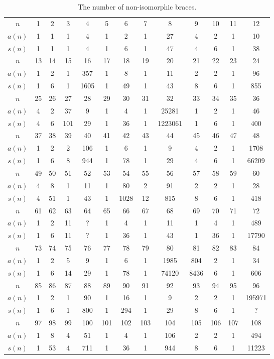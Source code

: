 \begin{table}[ht]
	\caption{The number of non-isomorphic braces.}
	\begin{tabular}{|c|cccccccccccc|}
		\hline
		$n$ & 1 & 2 & 3 & 4 & 5  & 6 & 7 & 8 & 9 & 10 & 11 & 12\tabularnewline
		$a(n)$ & 1  & 1  & 1  & 4  & 1  & 2  & 1  & 27  & 4  & 2  & 1  & 10\tabularnewline
		$s(n)$ & 1 & 1 & 1 & 4 & 1 & 6 & 1 & 47 & 4 & 6 & 1 & 38 \tabularnewline
		\hline
		$n$ & 13 & 14 & 15 & 16 & 17 & 18 & 19 & 20 & 21 & 22 & 23 & 24\tabularnewline
		$a(n)$ & 1  & 2  & 1  & 357  & 1  & 8  & 1  & 11  & 2  & 2  & 1  & 96\tabularnewline
		$s(n)$ & 1 & 6 & 1 & 1605 & 1 & 49 & 1 & 43 & 8 & 6 & 1 & 855 \tabularnewline
		\hline
		$n$ & 25 & 26 & 27 & 28 & 29 & 30 & 31 & 32 & 33 & 34 & 35 & 36\tabularnewline
		$a(n)$ & 4  & 2  & 37  & 9  & 1  & 4 & 1  & 25281  & 1  & 2  & 1  & 46\tabularnewline
		$s(n)$ & 4 & 6 & 101 & 29 & 1 & 36 & 1 & 1223061 &  1 & 6 & 1 & 400\tabularnewline
		\hline
		$n$ & 37 & 38 & 39 & 40 & 41 & 42 &  43 & 44 & 45 & 46 & 47 & 48\tabularnewline
		$a(n)$  & 1  & 2  & 2  & 106  & 1  & 6  & 1  & 9  & 4 & 2  & 1  & 1708\tabularnewline
		$s(n)$ & 1 & 6 & 8 & 944 & 1 & 78 & 1 & 29 & 4 & 6 & 1 & 66209 \tabularnewline
		\hline
		$n$    & 49 & 50 & 51 & 52 & 53 & 54 & 55 & 56 & 57 & 58 & 59 & 60\tabularnewline
		$a(n)$ &  4 & 8 & 1 & 11 & 1 & 80 & 2 & 91 & 2 & 2 & 1 & 28\tabularnewline
		$s(n)$ & 4 & 51 & 1 & 43 & 1 & 1028 &  12 & 815 & 8 & 6 & 1 & 418\tabularnewline

		\hline
		$n$ & 61 & 62 & 63 & 64 & 65 & 66 & 67 & 68 & 69 & 70 & 71 & 72\tabularnewline
		$a(n)$ & 1 & 2 & 11 & ? & 1 & 4 & 1 & 11 & 1 & 4 & 1 & 489\tabularnewline
		$s(n)$ & 1 & 6 & 11 & ? &  1 & 36 & 1 & 43 & 1 & 36 & 1 & 17790 \tabularnewline

		\hline
		$n$ & 73 & 74 & 75 & 76 & 77 & 78 & 79 & 80 & 81 & 82 & 83 & 84\tabularnewline
		$a(n)$ & 1 & 2 & 5 & 9 & 1 & 6 & 1 & 1985 & 804 & 2 & 1 & 34\tabularnewline
		$s(n)$ & 1 & 6 & 14 & 29 & 1 & 78 & 1 & 74120 & 8436 &  6 & 1 & 606\tabularnewline

		\hline
		$n$ & 85 & 86 & 87 & 88 & 89 & 90 & 91 & 92 & 93 & 94 & 95 & 96\tabularnewline
		$a(n)$ & 1 & 2 & 1 & 90 & 1 & 16 & 1 & 9 & 2 & 2 & 1 & 195971\tabularnewline
		$s(n)$ & 1 & 6 & 1 & 800 & 1 & 294 & 1 & 29 & 8 & 6 & 1 & ? \tabularnewline

		\hline
		$n$ & 97 & 98 & 99 & 100 & 101 & 102 & 103 & 104 & 105 & 106 & 107 & 108\tabularnewline
		$a(n)$ & 1 & 8 & 4 & 51 & 1 & 4 & 1 & 106 & 2 & 2 & 1 & 494 \tabularnewline
		$s(n)$ & 1 & 53 &  4 & 711 & 1 & 36 & 1 & 944 &  8 &  6 &  1 & 11223 \tabularnewline


\end{tabular}
\end{table}
